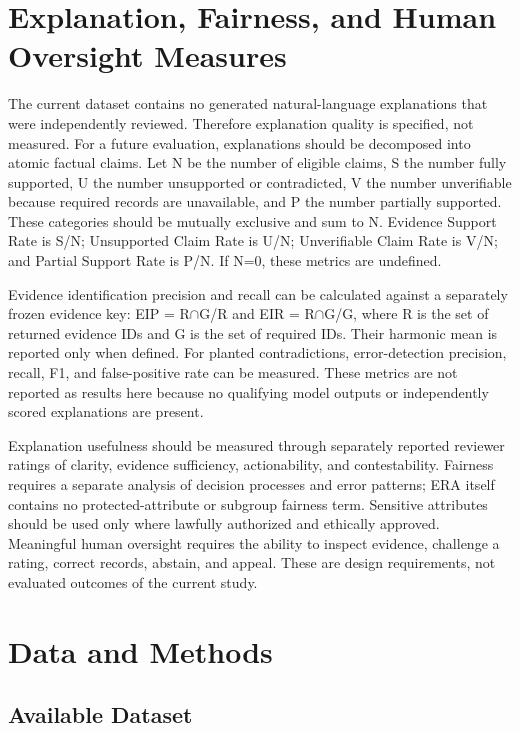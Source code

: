 \documentclass[
  10pt,
  a4paper,
  runningheads]{llncs}
\begin{document}
\section{Explanation, Fairness, and Human Oversight
Measures}\label{explanation-fairness-and-human-oversight-measures}

The current dataset contains no generated natural-language explanations
that were independently reviewed. Therefore explanation quality is
specified, not measured. For a future evaluation, explanations should be
decomposed into atomic factual claims. Let N be the number of eligible
claims, S the number fully supported, U the number unsupported or
contradicted, V the number unverifiable because required records are
unavailable, and P the number partially supported. These categories
should be mutually exclusive and sum to N. Evidence Support Rate is S/N;
Unsupported Claim Rate is U/N; Unverifiable Claim Rate is V/N; and
Partial Support Rate is P/N. If N=0, these metrics are undefined.

Evidence identification precision and recall can be calculated against a
separately frozen evidence key: EIP =
\textbar R$\cap$G\textbar/\textbar R\textbar{} and EIR =
\textbar R$\cap$G\textbar/\textbar G\textbar, where R is the set of returned
evidence IDs and G is the set of required IDs. Their harmonic mean is
reported only when defined. For planted contradictions, error-detection
precision, recall, F1, and false-positive rate can be measured. These
metrics are not reported as results here because no qualifying model
outputs or independently scored explanations are present.

Explanation usefulness should be measured through separately reported
reviewer ratings of clarity, evidence sufficiency, actionability, and
contestability. Fairness requires a separate analysis of decision
processes and error patterns; ERA itself contains no protected-attribute
or subgroup fairness term. Sensitive attributes should be used only
where lawfully authorized and ethically approved. Meaningful human
oversight requires the ability to inspect evidence, challenge a rating,
correct records, abstain, and appeal. These are design requirements, not
evaluated outcomes of the current study.

\section{Data and Methods}\label{data-and-methods}

\subsection{Available Dataset}\label{available-dataset}
\end{document}
